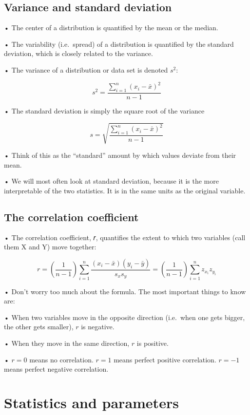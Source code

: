 \documentclass[
  letterpaper,
  DIV=11,
  numbers=noendperiod]{scrreprt}
\begin{document}
\hypertarget{variance-and-standard-deviation}{%
\subsection{Variance and standard
deviation}\label{variance-and-standard-deviation}}

• The center of a distribution is quantified by the mean or the median.

• The variability (i.e.~spread) of a distribution is quantified by the
standard deviation, which is closely related to the variance.

• The variance of a distribution or data set is denoted \(s^2\):

\[
s^2 = \frac{\sum^n_{i=1}(x_i - \bar{x})^2}{n-1}
\]

• The standard deviation is simply the square root of the variance

\[
s = \sqrt{\frac{\sum^n_{i=1}(x_i - \bar{x})^2}{n-1}}
\]

• Think of this as the ``standard'' amount by which values deviate from
their mean.

• We will most often look at standard deviation, because it is the more
interpretable of the two statistics. It is in the same units as the
original variable.

\hypertarget{the-correlation-coefficient}{%
\subsection{The correlation
coefficient}\label{the-correlation-coefficient}}

• The correlation coefficient, 𝑟, quantifies the extent to which two
variables (call them X and Y) move together:

\[
r = (\frac{1}{n-1})\sum^n_{i=1}\frac{(x_i - \bar{x})(y_i-\bar{y})}{s_xs_y} = (\frac{1}{n-1})\sum^n_{i=1}z_{x_i}z_{y_i}
\]

• Don't worry too much about the formula. The most important things to
know are:

• When two variables move in the opposite direction (i.e.~when one gets
bigger, the other gets smaller), \(r\) is negative.

• When they move in the same direction, \(r\) is positive.

• \(r = 0\) means no correlation. \(r =1\) means perfect positive
correlation. \(r = -1\) means perfect negative correlation.

\hypertarget{statistics-and-parameters}{%
\section{Statistics and parameters}\label{statistics-and-parameters}}
\end{document}
